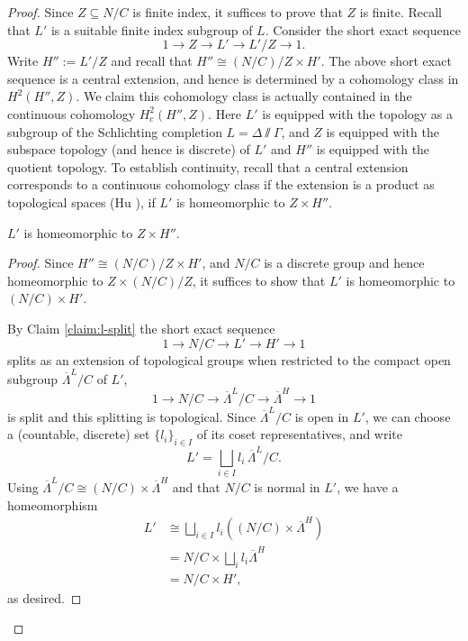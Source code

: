 \begin{proof} Since $Z\subseteq N/C$ is finite index, it suffices to prove that $Z$ is finite. Recall that $L'$ is a suitable finite index subgroup of $L$. Consider the short exact sequence
\begin{equation}\label{eq:ses-z}
1\to Z\to L'\to L'/Z\to 1.
\end{equation}
Write $H'':=L'/Z$ and recall that $H''\cong (N/C)/Z\times H'$. The above short exact sequence is a central extension, and hence is determined by a cohomology class in $H^2(H'',Z)$. We claim this cohomology class is actually contained in the continuous cohomology $H^2_c(H'',Z)$. Here $L'$ is equipped with the topology as a subgroup of the Schlichting completion $L=\Delta\sslash\Gamma$, and $Z$ is equipped with the subspace topology (and hence is discrete) of $L'$ and $H''$ is equipped with the quotient topology. To establish continuity, recall that a central extension corresponds to a continuous cohomology class if the extension is a product as topological spaces (Hu \cite[5.3]{Hu-cohomology}), \ie if $L'$ is homeomorphic to $Z \times H''$.
\begin{claim}\label{claim:top-split}
$L'$ is homeomorphic to $Z\times H''$.
\end{claim}
\begin{proof} Since $H''\cong (N/C)/Z\times H'$, and $N/C$ is a discrete group and hence homeomorphic to $Z\times (N/C)/Z$, it suffices to show that $L'$ is homeomorphic to $(N/C)\times H'$.

By Claim \ref{claim:l-split} the short exact sequence
\[
1\to N/C\to L'\to H'\to 1
\]
splits as an extension of topological groups when restricted to the compact open subgroup $\overline{\Lambda}^L/C$ of $L'$, \ie
\[
1\to N/C\to \overline{\Lambda}^L/C\to \overline{\Lambda}^H\to 1
\]
is split and this splitting is topological. Since $\overline{\Lambda}^L/C$ is open in $L'$, we can choose a (countable, discrete) set $\{l_i\}_{i\in I}$ of its coset representatives, and write
\[
L'=\bigsqcup_{i\in I} l_i \, \overline{\Lambda}^L/C.
\]
Using $\overline{\Lambda}^L/C\cong (N/C)\times \overline{\Lambda}^H$ and that $N/C$ is normal in $L'$, we have a homeomorphism
\begin{align*}
L' &\cong \bigsqcup_{i\in I} l_i ((N/C)\times \overline{\Lambda}^H) \\
&= N/C\times \bigsqcup_i l_i \overline{\Lambda}^H \\
&=N/C \times H',
\end{align*}
as desired.\end{proof}


\end{proof}
